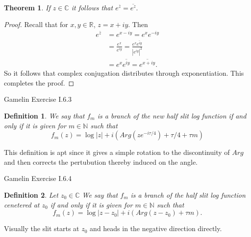\documentclass[letter]{article}
\newtheorem{theorem}{Theorem}
\newtheorem{definition}{Definition}
\newenvironment{menumerate}{%
  \edef\backupindent{\the\parindent}%
  \enumerate%
  \setlength{\parindent}{\backupindent}%
}{\endenumerate}
\begin{document}
\begin{menumerate}
\begin{theorem}
        If $z \in \mathbb{C}$ it follows that $e^{\overline{z}} = \overline{e^z}.$
    \end{theorem}
    \begin{proof}
        Recall that for $x,y \in \mathbb{R}$, $z = x + iy.$ Then
        \begin{equation}
            \begin{aligned}
                e^{\overline{z}} &= e^{x - iy} = e^{x}e^{-iy} \\
                &= \frac{e^{x}}{e^{iy}} = \frac{e^x\overline{e^{iy}}}{|e^{iy}|^2} \\
                &= e^x\overline{e^{iy}} = \overline{e^{x+iy}}.
            \end{aligned}
        \end{equation}
        So it follows that complex conjugation distributes through exponentiation. This completes the proof.
    \end{proof}
    \item Gamelin Exercise I.6.3
    \begin{definition}
        We say that $f_m$ is a branch of the new half slit log function if and only if it is given for $m\in\mathbb{N}$
        such that
        \begin{equation}
            f_m(z) = \log |z| + i(Arg(ze^{-i\tau/4}) + \tau/4 + \tau m)
        \end{equation}
    \end{definition}
    This definition is apt since it gives a simple rotation to the discontinuity of $Arg$ and then corrects the pertubution thereby induced on the angle.

    \item Gamelin Exercise I.6.4
    \begin{definition}
        Let $z_0 \in \mathbb{C}$ We say that $f_m$ is a branch of the  half slit log function cenetered at $z_0$ if and only if it is given for $m\in\mathbb{N}$
        such that
        \begin{equation}
            f_m(z) = \log |z-z_0| + i(Arg(z - z_0) + \tau m).
        \end{equation}
    \end{definition}

        Visually the slit starts at $z_0$ and heads in the negative direction directly.

\end{menumerate}
\end{document}

